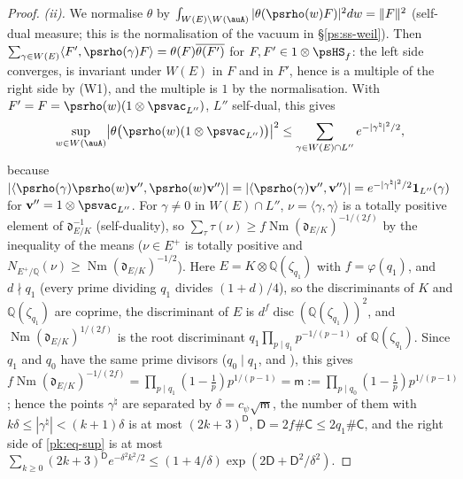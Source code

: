 \documentclass[10pt]{amsart}
\theoremstyle{definition}
\theoremstyle{remark}
\newcommand{\Q}{\mathbb Q}
\providecommand{\auNm}{\operatorname{Nm}}
\providecommand{\aubar}[1]{\overline{#1}}
\begin{document}
\begin{proof}
\emph{(ii).} We normalise $\theta$ by $\int_{W(E)\backslash W(\auA)}|\theta(\psrho(w)F)|^2dw=\|F
\|^2$ (self-dual measure; this is the normalisation of the vacuum in \S\ref{ps:ss-weil}). Then
$\sum_{\gamma\in W(E)}\langle F',\psrho(\gamma)F\rangle=\theta(F)\aubar{\theta(F')}$ for
$F,F'\in1\otimes\psHS_f$: the left side converges, is invariant under $W(E)$ in $F$ and in $F'$,
hence is a multiple of the right side by (W1), and the multiple is $1$ by the normalisation. With
$F'=F=\psrho(w)(1\otimes\psvac_{L''})$, $L''$ self-dual, this gives
\begin{equation}\label{pk:eq-sup}
\sup_{w\in W(\auA)}\bigl|\theta\bigl(\psrho(w)(1\otimes\psvac_{L''})\bigr)\bigr|^2\le\sum_{\gamma\in
W(E)\cap L''}e^{-|\gamma^\natural|^2/2},
\end{equation}
because $|\langle\psrho(\gamma)\psrho(w)\mathbf v'',\psrho(w)\mathbf v''\rangle|=|\langle\psrho(\gamma)
\mathbf v'',\mathbf v''\rangle|=e^{-|\gamma^\natural|^2/2}\mathbf 1_{L''}(\gamma)$ for $\mathbf v''=1\otimes
\psvac_{L''}$. For $\gamma\ne0$ in $W(E)\cap L''$, $\nu=\langle\gamma,\gamma\rangle$ is a totally
positive element of $\mathfrak d_{E/K}^{-1}$ (self-duality), so $\sum_\tau\tau(\nu)\ge
f\auNm(\mathfrak d_{E/K})^{-1/(2f)}$ by the inequality of the means ($\nu\in E^+$ is totally
positive and $N_{E^+/\Q}(\nu)\ge\auNm(\mathfrak d_{E/K})^{-1/2}$). Here $E=K\otimes\Q(\zeta_{q_1})$
with $f=\varphi(q_1)$, and $d\nmid q_1$ (every prime dividing $q_1$ divides $(1+d)/4$), so the
discriminants of $K$ and $\Q(\zeta_{q_1})$ are coprime, the discriminant of $E$ is
$d^f\operatorname{disc}(\Q(\zeta_{q_1}))^2$, and $\auNm(\mathfrak d_{E/K})^{1/(2f)}$ is the root
discriminant $q_1\prod_{p\mid q_1}p^{-1/(p-1)}$ of $\Q(\zeta_{q_1})$. Since $q_1$ and $q_0$ have the same
prime divisors ($q_0\mid q_1$, and {\cite[Lemma~13.4(S7)]{P46}}), this gives
$f\auNm(\mathfrak d_{E/K})^{-1/(2f)}=\prod_{p\mid q_1}(1-\tfrac1p)p^{1/(p-1)}=\mathsf m:=\prod_{p\mid q_0}
(1-\tfrac1p)p^{1/(p-1)}$; hence the
points $\gamma^\natural$ are separated by $\delta=c_\psi\sqrt{\mathsf m}$, the number of them with
$k\delta\le|\gamma^\natural|<(k+1)\delta$ is at most $(2k+3)^{\mathsf D}$, $\mathsf D=2f\#\mathsf
C\le2q_1\#\mathsf C$, and the right side of \eqref{pk:eq-sup} is at most $\sum_{k\ge0}(2k+3)^{
\mathsf D}e^{-\delta^2k^2/2}\le(1+4/\delta)\exp(2\mathsf D+\mathsf D^2/\delta^2)$.


\end{proof}
\end{document}
